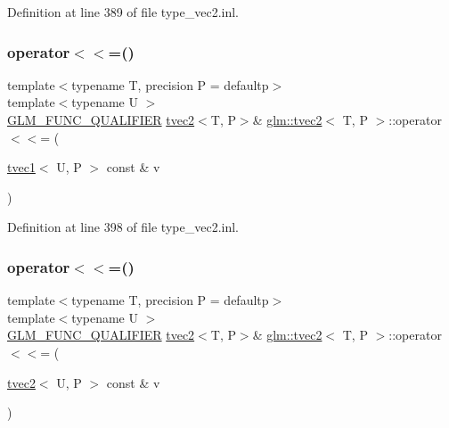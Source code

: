 Definition at line 389 of file type\+\_\+vec2.\+inl.

\mbox{\label{structglm_1_1tvec2_a4ee968bac5e887631cb05668dd34da58}} 
\subsubsection{\texorpdfstring{operator$<$$<$=()}{operator<<=()}\hspace{0.1cm}{\footnotesize\ttfamily [5/6]}}
{\footnotesize\ttfamily template$<$typename T, precision P = defaultp$>$ \\
template$<$typename U $>$ \\
\mbox{\hyperlink{setup_8hpp_a33fdea6f91c5f834105f7415e2a64407}{G\+L\+M\+\_\+\+F\+U\+N\+C\+\_\+\+Q\+U\+A\+L\+I\+F\+I\+ER}} \mbox{\hyperlink{structglm_1_1tvec2}{tvec2}}$<$T, P$>$\& \mbox{\hyperlink{structglm_1_1tvec2}{glm\+::tvec2}}$<$ T, P $>$\+::operator$<$$<$= (\begin{DoxyParamCaption}\item[{\mbox{\hyperlink{structglm_1_1tvec1}{tvec1}}$<$ U, P $>$ const \&}]{v }\end{DoxyParamCaption})}



Definition at line 398 of file type\+\_\+vec2.\+inl.

\mbox{\label{structglm_1_1tvec2_adc5cbebcee78fbff8fee4978e4dd8c87}} 
\subsubsection{\texorpdfstring{operator$<$$<$=()}{operator<<=()}\hspace{0.1cm}{\footnotesize\ttfamily [6/6]}}
{\footnotesize\ttfamily template$<$typename T, precision P = defaultp$>$ \\
template$<$typename U $>$ \\
\mbox{\hyperlink{setup_8hpp_a33fdea6f91c5f834105f7415e2a64407}{G\+L\+M\+\_\+\+F\+U\+N\+C\+\_\+\+Q\+U\+A\+L\+I\+F\+I\+ER}} \mbox{\hyperlink{structglm_1_1tvec2}{tvec2}}$<$T, P$>$\& \mbox{\hyperlink{structglm_1_1tvec2}{glm\+::tvec2}}$<$ T, P $>$\+::operator$<$$<$= (\begin{DoxyParamCaption}\item[{\mbox{\hyperlink{structglm_1_1tvec2}{tvec2}}$<$ U, P $>$ const \&}]{v }\end{DoxyParamCaption})}



